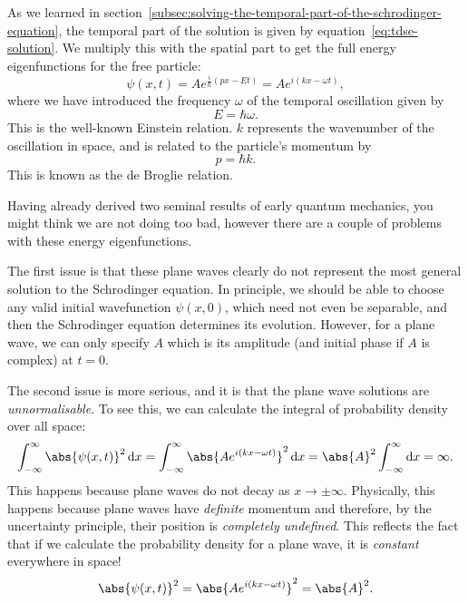 \documentclass[../quantum_mechanics.tex]{subfiles}
\begin{document}
            As we learned in section~\ref{subsec:solving-the-temporal-part-of-the-schrodinger-equation}, the temporal part of the solution is given by equation~\ref{eq:tdse-solution}.
            We multiply this with the spatial part to get the full energy eigenfunctions for the free particle:
            \begin{equation}
                \psi(x,t)=Ae^{\frac{i}{\hbar}(px-Et)}=Ae^{i(kx-\omega t)},
            \end{equation}
            where we have introduced the frequency $\omega$ of the temporal oscillation given by
            \begin{equation}\label{eq:einstein-relation}
                E=\hbar\omega.
            \end{equation}
            This is the well-known Einstein relation.
            $k$ represents the wavenumber of the oscillation in space, and is related to the particle's momentum by
            \begin{equation}\label{eq:de-broglie-relation}
                p=\hbar k.
            \end{equation}
            This is known as the de Broglie relation.

            Having already derived two seminal results of early quantum mechanics, you might think we are not doing too bad, however there are a couple of problems with these energy eigenfunctions.

            The first issue is that these plane waves clearly do not represent the most general solution to the Schrodinger equation.
            In principle, we should be able to choose any valid initial wavefunction $\psi(x,0)$, which need not even be separable, and then the Schrodinger equation determines its evolution.
            However, for a plane wave, we can only specify $A$ which is its amplitude (and initial phase if $A$ is complex) at $t=0$.

            The second issue is more serious, and it is that the plane wave solutions are \textit{unnormalisable}.
            To see this, we can calculate the integral of probability density over all space:
            \begin{equation}
                \int_{-\infty}^\infty\abs{\psi(x,t)}^2\dd{x}=\int_{-\infty}^\infty\abs{Ae^{i(kx-\omega t)}}^2\dd{x}=\abs{A}^2\int_{-\infty}^\infty\dd{x}=\infty.
            \end{equation}
            This happens because plane waves do not decay as $x\to\pm\infty$.
            Physically, this happens because plane waves have \textit{definite} momentum and therefore, by the uncertainty principle, their position is \textit{completely undefined}.
            This reflects the fact that if we calculate the probability density for a plane wave, it is \textit{constant} everywhere in space!
            \begin{equation}
                \abs{\psi(x,t)}^2=\abs{Ae^{i(kx-\omega t)}}^2=\abs{A}^2.
            \end{equation}
\end{document}

